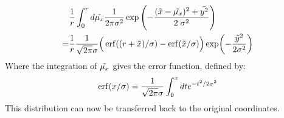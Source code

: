 \begin{align}
    &\frac{1}{r} \int_0^r d\Tilde{\mu_x} \frac{1}{2 \pi \sigma^2} \exp \left(- \frac{(\Tilde{x} - \Tilde{\mu_x})^2 + \Tilde{y^2}}{2 \; \sigma^2} \right) \\
    = &\frac{1}{r}\frac{1}{\sqrt{2 \pi} \sigma} \Big(\erf((r + \Tilde{x}) / \sigma) - \erf(\Tilde{x} / \sigma)\Big) \exp(-\frac{\Tilde{y}^2}{2 \sigma^2})
\end{align}
Where the integration of $\Tilde{\mu_x}$ gives the error function, defined by: 
\begin{equation}
    \erf(x/\sigma) = \frac{1}{\sqrt{2 \pi }\sigma} \int_0^x dt e^{-t^2/2\sigma^2}
\end{equation}
This distribution can now be transferred back to the original coordinates. 
